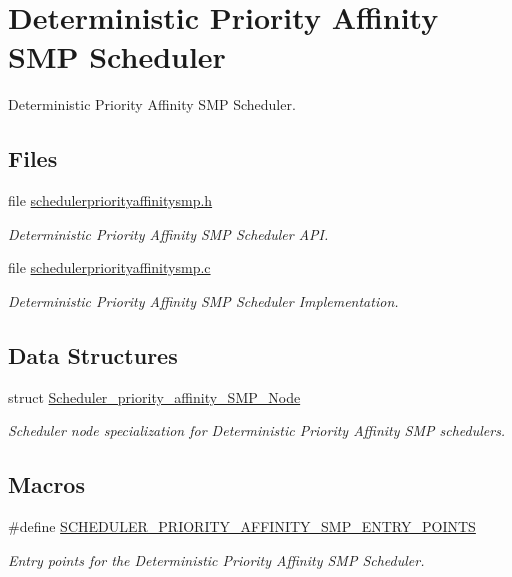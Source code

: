 \hypertarget{group__RTEMSScoreSchedulerPriorityAffinitySMP}{}\section{Deterministic Priority Affinity S\+MP Scheduler}
\label{group__RTEMSScoreSchedulerPriorityAffinitySMP}


Deterministic Priority Affinity S\+MP Scheduler.  


\subsection*{Files}
\begin{DoxyCompactItemize}
\item 
file \mbox{\hyperlink{schedulerpriorityaffinitysmp_8h}{schedulerpriorityaffinitysmp.\+h}}
\begin{DoxyCompactList}\small\item\em Deterministic Priority Affinity S\+MP Scheduler A\+PI. \end{DoxyCompactList}\item 
file \mbox{\hyperlink{schedulerpriorityaffinitysmp_8c}{schedulerpriorityaffinitysmp.\+c}}
\begin{DoxyCompactList}\small\item\em Deterministic Priority Affinity S\+MP Scheduler Implementation. \end{DoxyCompactList}\end{DoxyCompactItemize}
\subsection*{Data Structures}
\begin{DoxyCompactItemize}
\item 
struct \mbox{\hyperlink{structScheduler__priority__affinity__SMP__Node}{Scheduler\+\_\+priority\+\_\+affinity\+\_\+\+S\+M\+P\+\_\+\+Node}}
\begin{DoxyCompactList}\small\item\em Scheduler node specialization for Deterministic Priority Affinity S\+MP schedulers. \end{DoxyCompactList}\end{DoxyCompactItemize}
\subsection*{Macros}
\begin{DoxyCompactItemize}
\item 
\#define \mbox{\hyperlink{group__RTEMSScoreSchedulerPriorityAffinitySMP_ga666011a4b0a4074e8ad6d74ae8a2b417}{S\+C\+H\+E\+D\+U\+L\+E\+R\+\_\+\+P\+R\+I\+O\+R\+I\+T\+Y\+\_\+\+A\+F\+F\+I\+N\+I\+T\+Y\+\_\+\+S\+M\+P\+\_\+\+E\+N\+T\+R\+Y\+\_\+\+P\+O\+I\+N\+TS}}
\begin{DoxyCompactList}\small\item\em Entry points for the Deterministic Priority Affinity S\+MP Scheduler. \end{DoxyCompactList}\end{DoxyCompactItemize}
